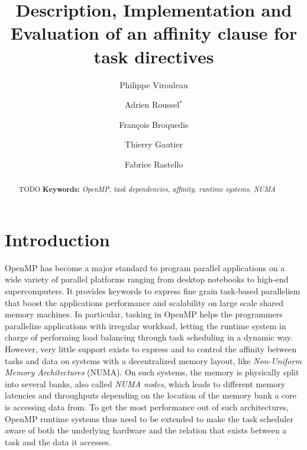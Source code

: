 \documentclass{Styles/llncs}
\begin{document}
\title{Description, Implementation and Evaluation of an affinity clause for task directives}
\author{
  Philippe Virouleau \and Adrien Roussel$^{*}$ \and François Broquedis \and Thierry Gautier \and Fabrice Rastello
 \vspace*{-1ex}}
\date{}
\maketitle

\begin{abstract}
  \vspace*{-5ex} TODO
\smallskip
  \noindent\textbf{Keywords:}
  \emph{
    OpenMP, task dependencies, affinity, runtime systems, NUMA
  }
\end{abstract}


\section{Introduction}

OpenMP has become a major standard to program parallel applications on a wide variety of parallel platforms ranging from desktop notebooks to high-end supercomputers. It provides keywords to express fine grain task-based parallelism that boost the applications performance and scalability on large scale shared memory machines. In particular, tasking in OpenMP helps the programmers parallelize applications with irregular workload, letting the runtime system in charge of performing load balancing through task scheduling in a dynamic way. However, very little support exists to express and to control the affinity between tasks and data on systems with a decentralized memory layout, like \emph{Non-Uniform Memory Architectures} (NUMA). On such systems, the memory is physically split into several banks, also called \emph{NUMA nodes}, which leads to different memory latencies and throughputs depending on the location of the memory bank a core is accessing data from. To get the most performance out of such architectures, OpenMP runtime systems thus need to be extended to make the task scheduler aware of both the underlying hardware and the relation that exists between a task and the data it accesses.
\end{document}
